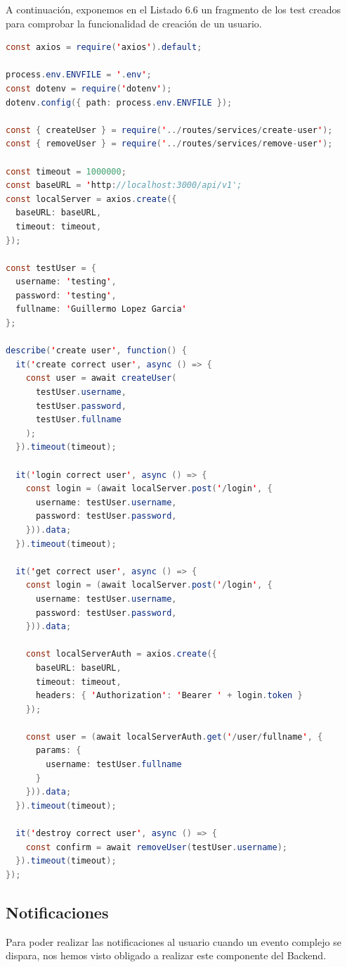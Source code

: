 A continuación, exponemos en el Listado 6.6 un fragmento de los test creados para comprobar la funcionalidad de creación de un usuario.

\begin{lstlisting}[language=Java,caption={Test User},captionpos=b]
const axios = require('axios').default;

process.env.ENVFILE = '.env';
const dotenv = require('dotenv');
dotenv.config({ path: process.env.ENVFILE });

const { createUser } = require('../routes/services/create-user');
const { removeUser } = require('../routes/services/remove-user');

const timeout = 1000000;
const baseURL = 'http://localhost:3000/api/v1';
const localServer = axios.create({
  baseURL: baseURL,
  timeout: timeout,
});

const testUser = {
  username: 'testing',
  password: 'testing',
  fullname: 'Guillermo Lopez Garcia'
};

describe('create user', function() {
  it('create correct user', async () => {
    const user = await createUser(
      testUser.username,
      testUser.password,
      testUser.fullname
    );
  }).timeout(timeout);

  it('login correct user', async () => {
    const login = (await localServer.post('/login', {
      username: testUser.username,
      password: testUser.password,
    })).data;
  }).timeout(timeout);

  it('get correct user', async () => {
    const login = (await localServer.post('/login', {
      username: testUser.username,
      password: testUser.password,
    })).data;

    const localServerAuth = axios.create({
      baseURL: baseURL,
      timeout: timeout,
      headers: { 'Authorization': 'Bearer ' + login.token }
    });

    const user = (await localServerAuth.get('/user/fullname', {
      params: {
        username: testUser.fullname
      }
    })).data;
  }).timeout(timeout);

  it('destroy correct user', async () => {
    const confirm = await removeUser(testUser.username);
  }).timeout(timeout);
});
\end{lstlisting}

\subsection{Notificaciones}
Para poder realizar las notificaciones al usuario cuando un evento complejo se dispara, nos hemos visto obligado a realizar este componente del Backend.

